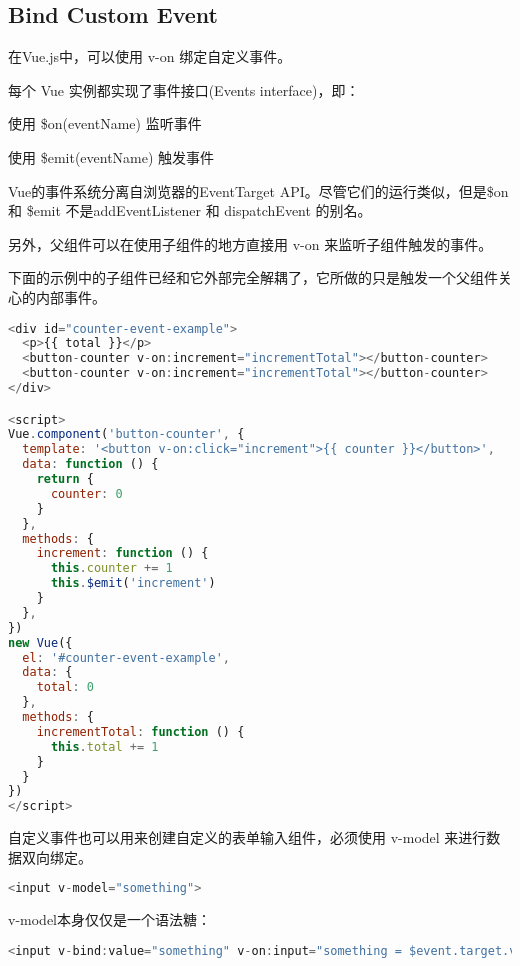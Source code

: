\subsection{Bind Custom Event}

在Vue.js中，可以使用 v-on 绑定自定义事件。

每个 Vue 实例都实现了事件接口(Events interface)，即：

\begin{compactitem}
\item 使用 \$on(eventName) 监听事件
\item 使用 \$emit(eventName) 触发事件
\end{compactitem}

Vue的事件系统分离自浏览器的EventTarget API。尽管它们的运行类似，但是\$on 和 \$emit 不是addEventListener 和 dispatchEvent 的别名。

另外，父组件可以在使用子组件的地方直接用 v-on 来监听子组件触发的事件。




下面的示例中的子组件已经和它外部完全解耦了，它所做的只是触发一个父组件关心的内部事件。





\begin{lstlisting}[language=JavaScript]
<div id="counter-event-example">
  <p>{{ total }}</p>
  <button-counter v-on:increment="incrementTotal"></button-counter>
  <button-counter v-on:increment="incrementTotal"></button-counter>
</div>

<script>
Vue.component('button-counter', {
  template: '<button v-on:click="increment">{{ counter }}</button>',
  data: function () {
    return {
      counter: 0
    }
  },
  methods: {
    increment: function () {
      this.counter += 1
      this.$emit('increment')
    }
  },
})
new Vue({
  el: '#counter-event-example',
  data: {
    total: 0
  },
  methods: {
    incrementTotal: function () {
      this.total += 1
    }
  }
})
</script>
\end{lstlisting}



自定义事件也可以用来创建自定义的表单输入组件，必须使用 v-model 来进行数据双向绑定。


\begin{lstlisting}[language=JavaScript]
<input v-model="something">
\end{lstlisting}

v-model本身仅仅是一个语法糖：

\begin{lstlisting}[language=JavaScript]
<input v-bind:value="something" v-on:input="something = $event.target.value">
\end{lstlisting}

